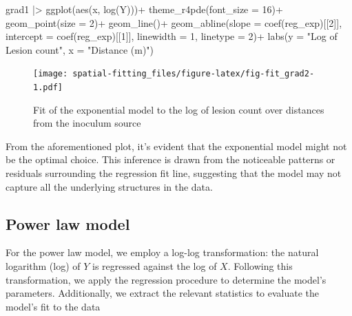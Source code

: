 \documentclass[
  letterpaper,
]{book}
\newenvironment{Shaded}{\begin{snugshade}}{\end{snugshade}}
\newcommand{\AttributeTok}[1]{\textcolor[rgb]{0.40,0.45,0.13}{#1}}
\newcommand{\DecValTok}[1]{\textcolor[rgb]{0.68,0.00,0.00}{#1}}
\newcommand{\FunctionTok}[1]{\textcolor[rgb]{0.28,0.35,0.67}{#1}}
\newcommand{\NormalTok}[1]{\textcolor[rgb]{0.00,0.23,0.31}{#1}}
\newcommand{\SpecialCharTok}[1]{\textcolor[rgb]{0.37,0.37,0.37}{#1}}
\newcommand{\StringTok}[1]{\textcolor[rgb]{0.13,0.47,0.30}{#1}}
\begin{document}
\begin{Shaded}
\begin{Highlighting}[]
\NormalTok{grad1 }\SpecialCharTok{|\textgreater{}} 
  \FunctionTok{ggplot}\NormalTok{(}\FunctionTok{aes}\NormalTok{(x, }\FunctionTok{log}\NormalTok{(Y)))}\SpecialCharTok{+}
  \FunctionTok{theme\_r4pde}\NormalTok{(}\AttributeTok{font\_size =} \DecValTok{16}\NormalTok{)}\SpecialCharTok{+}
  \FunctionTok{geom\_point}\NormalTok{(}\AttributeTok{size =} \DecValTok{2}\NormalTok{)}\SpecialCharTok{+}
  \FunctionTok{geom\_line}\NormalTok{()}\SpecialCharTok{+}
  \FunctionTok{geom\_abline}\NormalTok{(}\AttributeTok{slope =} \FunctionTok{coef}\NormalTok{(reg\_exp)[[}\DecValTok{2}\NormalTok{]], }\AttributeTok{intercept =} \FunctionTok{coef}\NormalTok{(reg\_exp)[[}\DecValTok{1}\NormalTok{]],}
              \AttributeTok{linewidth =} \DecValTok{1}\NormalTok{, }\AttributeTok{linetype =} \DecValTok{2}\NormalTok{)}\SpecialCharTok{+}
 \FunctionTok{labs}\NormalTok{(}\AttributeTok{y =} \StringTok{"Log of Lesion count"}\NormalTok{,}
       \AttributeTok{x =} \StringTok{"Distance (m)"}\NormalTok{)}
\end{Highlighting}
\end{Shaded}

\begin{figure}

\texttt{[image: spatial-fitting\_files/figure-latex/fig-fit\_grad2-1.pdf]} \hfill{}

\caption{\label{fig-fit_grad2}Fit of the exponential model to the log of
lesion count over distances from the inoculum source}

\end{figure}

From the aforementioned plot, it's evident that the exponential model
might not be the optimal choice. This inference is drawn from the
noticeable patterns or residuals surrounding the regression fit line,
suggesting that the model may not capture all the underlying structures
in the data.

\hypertarget{power-law-model-1}{%
\subsection{Power law model}\label{power-law-model-1}}

For the power law model, we employ a log-log transformation: the natural
logarithm (log) of \(Y\) is regressed against the log of \(X\).
Following this transformation, we apply the regression procedure to
determine the model's parameters. Additionally, we extract the relevant
statistics to evaluate the model's fit to the data
\end{document}
